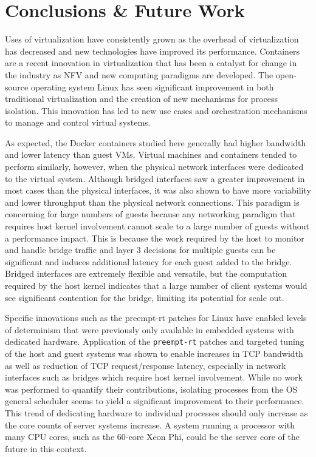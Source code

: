 \chapter{Conclusions \& Future Work}
\label{sec:conclusions}
Uses of virtualization have consistently grown as the overhead of virtualization has decreased and new technologies have improved its performance.  
Containers are a recent innovation in virtualization that has been a catalyst for change in the industry as NFV and new computing paradigms are developed.
The open-source operating system Linux has seen significant improvement in both traditional virtualization and the creation of new mechanisms for process isolation.  
This innovation has led to new use cases and orchestration mechanisms to manage and control virtual systems.

As expected, the Docker containers studied here generally had higher bandwidth and lower latency than guest VMs.
Virtual machines and containers tended to perform similarly, however, when the physical network interfaces were dedicated to the virtual system.
Although bridged interfaces saw a greater improvement in most cases than the physical interfaces, it was also shown to have more variability and lower throughput than the physical network connections.  
This paradigm is concerning for large numbers of guests because any networking paradigm that requires host kernel involvement cannot scale to a large number of guests without a performance impact.
This is because the work required by the host to monitor and handle bridge traffic and layer 3 decisions for multiple guests can be significant and induces additional latency for each guest added to the bridge.    
Bridged interfaces are extremely flexible and versatile, but the computation required by the host kernel indicates that a large number of client systems would see significant contention for the bridge, limiting its potential for scale out.

Specific innovations such as the preempt-rt patches for Linux have enabled levels of determinism that were previously only available in embedded systems with dedicated hardware.  
Application of the \texttt{preempt-rt} patches and targeted tuning of the host and guest systems was shown to enable increases in TCP bandwidth as well as reduction of TCP request/response latency, especially in network interfaces such as bridges which require host kernel involvement.   
While no work was performed to quantify their contributions, isolating processes from the OS general scheduler seems to yield a significant improvement to their performance.
This trend of dedicating hardware to individual processes should only increase as the core counts of server systems increase.
A system running a processor with many CPU cores, such as the 60-core Xeon Phi, could be the server core of the future in this context.

